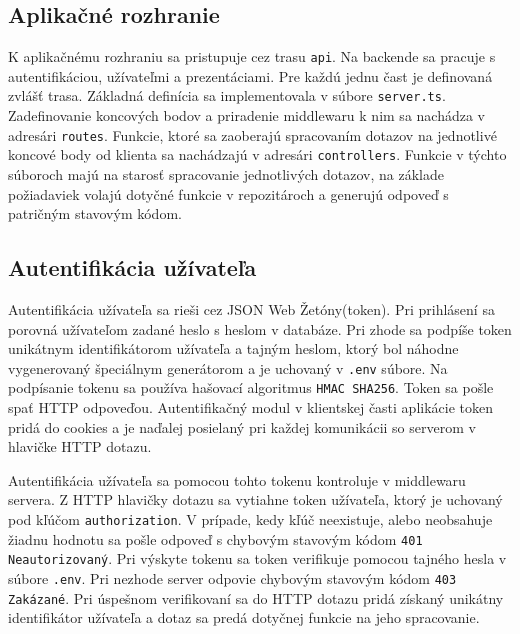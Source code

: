 \subsection{Aplikačné rozhranie}
K aplikačnému rozhraniu sa pristupuje cez trasu \texttt{api}. Na backende sa pracuje s autentifikáciou, užívateľmi a prezentáciami. Pre každú jednu čast je definovaná zvlášť trasa. Základná definícia sa implementovala v súbore \texttt{server.ts}. Zadefinovanie koncových bodov a priradenie middlewaru k nim sa nachádza v adresári \texttt{routes}. Funkcie, ktoré sa zaoberajú spracovaním dotazov na jednotlivé koncové body od klienta sa nachádzajú v adresári \texttt{controllers}. Funkcie v týchto súboroch majú na starosť spracovanie jednotlivých dotazov, na základe požiadaviek volajú dotyčné funkcie v repozitároch a generujú odpoveď s patričným stavovým kódom.

\subsection{Autentifikácia užívateľa}
\label{jwtauth}
Autentifikácia užívateľa sa rieši cez JSON Web Žetóny(token). Pri prihlásení sa porovná užívateľom zadané heslo s heslom v databáze. Pri zhode sa podpíše token unikátnym identifikátorom užívateľa a tajným heslom, ktorý bol náhodne vygenerovaný špeciálnym generátorom a je uchovaný v \texttt{.env} súbore. Na podpísanie tokenu sa používa hašovací algoritmus \texttt{HMAC SHA256}.
Token sa pošle spať HTTP odpoveďou. Autentifikačný modul v klientskej časti aplikácie token pridá do cookies a je naďalej posielaný pri každej komunikácii so serverom v hlavičke HTTP dotazu.

Autentifikácia užívateľa sa pomocou tohto tokenu kontroluje v middlewaru servera. Z HTTP hlavičky dotazu sa vytiahne token užívateľa, ktorý je uchovaný pod kľúčom \texttt{authorization}. V prípade, kedy kľúč neexistuje, alebo neobsahuje žiadnu hodnotu sa pošle odpoveď s chybovým stavovým kódom \texttt{401 Neautorizovaný}. Pri výskyte tokenu sa token verifikuje pomocou tajného hesla v súbore \texttt{.env}. Pri nezhode server odpovie chybovým stavovým kódom \texttt{403 Zakázané}. Pri úspešnom verifikovaní sa do HTTP dotazu pridá získaný unikátny identifikátor užívateľa a dotaz sa predá dotyčnej funkcie na jeho spracovanie.